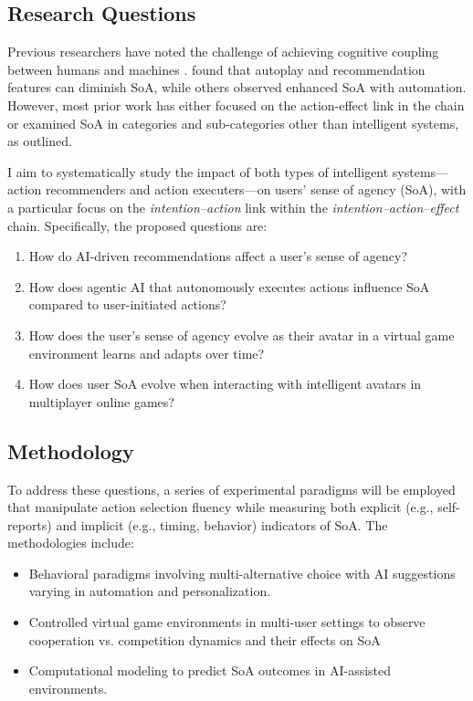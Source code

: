 \documentclass[12pt]{article}
\begin{document}
\subsection{Research Questions}

Previous researchers have noted the challenge of achieving cognitive coupling between humans and machines \citep{berberian2019man}. \citet{lukoff2021design} found that autoplay and recommendation features can diminish SoA, while others \citep{kumar2014naturalizing, kumar2017multi, ueda2021influence} observed enhanced SoA with automation. However, most prior work has either focused on the action-effect link in the chain or examined SoA in categories and sub-categories other than intelligent systems, as \citet{cornelio2022sense} outlined.


I aim to systematically study the impact of both types of intelligent systems—action recommenders and action executers—on users’ sense of agency (SoA), with a particular focus on the \textit{intention–action} link within the \textit{intention–action–effect} chain.
Specifically, the proposed questions are:

\begin{enumerate}[label=\arabic*.]
    \item How do AI-driven recommendations affect a user’s sense of agency?
    \item How does agentic AI that autonomously executes actions influence SoA compared to user-initiated actions?
    \item How does the user’s sense of agency evolve as their avatar in a virtual game environment learns and adapts over time?
    \item How does user SoA evolve when interacting with intelligent avatars in multiplayer online games?
\end{enumerate}

\subsection{Methodology}

To address these questions, a series of experimental paradigms will be employed that manipulate action selection fluency while measuring both explicit (e.g., self-reports) and implicit (e.g., timing, behavior) indicators of SoA. The methodologies include:

\begin{itemize}
    \item Behavioral paradigms involving multi-alternative choice with AI suggestions varying in automation and personalization.
    \item Controlled virtual game environments in multi-user settings to observe cooperation vs. competition dynamics and their effects on SoA
    \item Computational modeling to predict SoA outcomes in AI-assisted environments.
\end{itemize}
\end{document}
